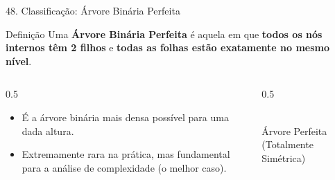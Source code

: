 \documentclass[9pt]{beamer}
\begin{document}
    \begin{frame}{48. Classificação: Árvore Binária Perfeita}
        \begin{block}{Definição}
            Uma \textbf{Árvore Binária Perfeita} é aquela em que \textbf{todos os nós internos têm 2 filhos} e \textbf{todas as folhas estão exatamente no mesmo nível}.
        \end{block}
        \vspace{0.3cm}
        \begin{columns}
            \begin{column}{0.5\textwidth}
                \begin{itemize}
                    \item É a árvore binária mais densa possível para uma dada altura.
                    \item Extremamente rara na prática, mas fundamental para a análise de complexidade (o melhor caso).
                \end{itemize}
            \end{column}
            \begin{column}{0.5\textwidth}
                \centering
                \\
                \vspace{0.2cm}
                \tiny Árvore Perfeita (Totalmente Simétrica)
            \end{column}
        \end{columns}
    \end{frame}
\end{document}

